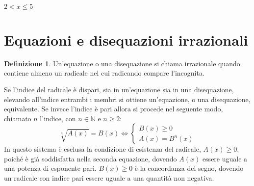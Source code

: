 \documentclass[a4paper]{article}
\theoremstyle{plain}
\theoremstyle{definition}
\newtheorem{definizione}{Definizione}
\theoremstyle{remark}
\newcommand{\N}{\mathbb{N}}
\begin{document}

$2<x\leq5$
\newpage
\section{Equazioni e disequazioni irrazionali}
\begin{definizione}
    Un'equazione o una disequazione si chiama irrazionale quando contiene almeno un radicale nel cui radicando compare l'incognita.
\end{definizione}
Se l'indice del radicale è dispari, sia in un'equazione sia in una disequazione, elevando all'indice entrambi i membri si ottiene un'equazione, o una disequazione, equivalente.
Se invece l'indice è pari allora si procede nel seguente modo, chiamato $n$ l'indice, con $n\in\N$ e $n\geq2$:
\begin{equation}
    \sqrt[n]{A(x)}=B(x)\iff\begin{cases}
        B(x)\geq0\\
        A(x)=B^n(x)
    \end{cases}
\end{equation}
In questo sistema è esclusa la condizione di esistenza del radicale, $A(x)\geq0$, poiché è già soddisfatta nella seconda equazione, dovendo $A(x)$ essere uguale a una potenza di esponente pari. $B(x)\ge0$ è la concordanza del segno, dovendo un radicale con indice pari essere uguale a una quantità non negativa.
\end{document}
